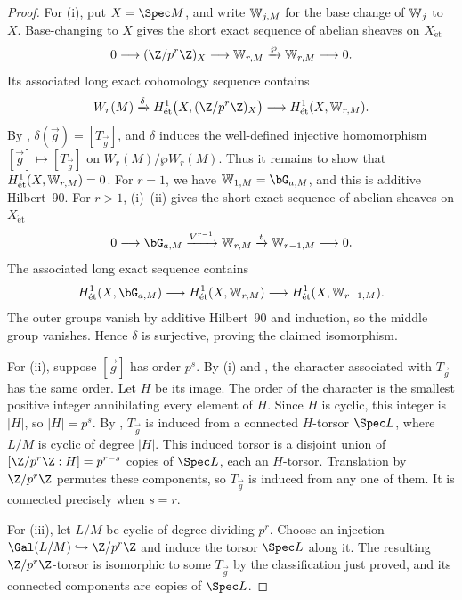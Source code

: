 \begin{proof}
For (i), put $X=\Spec M$, and write $\mathbb{W}_{j,M}$ for the base change of $\mathbb{W}_j$
to $X$. Base-changing  to $X$ gives the
short exact sequence of abelian sheaves on $X_{\mathrm{\acute et}}$
\[
0\longrightarrow(\Z/p^r\Z)_X
\longrightarrow\bW_{r,M}\xrightarrow{\wp}\bW_{r,M}
\longrightarrow0.
\]
Its associated long exact cohomology sequence contains
\[
W_r(M)\xrightarrow{\delta}
H^1_{\mathrm{\acute et}}\bigl(X,(\Z/p^r\Z)_X\bigr)
\longrightarrow H^1_{\mathrm{\acute et}}(X,\bW_{r,M}).
\]
By , $\delta(\vec g)=[T_{\vec g}]$,
and $\delta$ induces the well-defined injective homomorphism
$[\vec g]\mapsto[T_{\vec g}]$ on $W_r(M)/\wp W_r(M)$.
Thus it remains to show that $H^1_{\mathrm{\acute et}}(X,\mathbb{W}_{r,M})=0$.
For $r=1$, we have $\bW_{1,M}=\bG_{a,M}$, and this is additive
Hilbert~90. For $r>1$, (i)--(ii) gives the
short exact sequence of abelian sheaves on $X_{\mathrm{\acute et}}$
\[
0\longrightarrow\bG_{a,M}\xrightarrow{V^{r-1}}\bW_{r,M}
\xrightarrow{t}\bW_{r-1,M}\longrightarrow0.
\]
The associated long exact sequence contains
\[
H^1_{\mathrm{\acute et}}(X,\bG_{a,M})
\longrightarrow
H^1_{\mathrm{\acute et}}(X,\bW_{r,M})
\longrightarrow
H^1_{\mathrm{\acute et}}(X,\bW_{r-1,M}).
\]
The outer groups vanish by additive Hilbert~90 and induction, so the middle
group vanishes. Hence $\delta$ is surjective, proving the claimed
isomorphism.

For (ii), suppose $[\vec g]$ has order $p^s$. By (i) and
, the character associated
with $T_{\vec g}$ has the same order. Let $H$ be its image. The order of
the character is the smallest positive integer annihilating every element
of $H$. Since $H$ is cyclic, this integer is $|H|$, so $|H|=p^s$.
By , $T_{\vec g}$ is induced
from a connected $H$-torsor $\Spec L$, where $L/M$ is cyclic of degree
$|H|$. This induced torsor is a disjoint union of
$[\Z/p^r\Z:H]=p^{r-s}$ copies of $\Spec L$, each an $H$-torsor.
Translation by $\Z/p^r\Z$ permutes these components, so $T_{\vec g}$ is
induced from any one of them. It is connected precisely when $s=r$.

For (iii), let $L/M$ be cyclic of degree dividing $p^r$. Choose an
injection $\Gal(L/M)\hookrightarrow\Z/p^r\Z$ and induce the torsor
$\Spec L$ along it. The resulting $\Z/p^r\Z$-torsor is isomorphic to some
$T_{\vec g}$ by the classification just proved, and its connected
components are copies of $\Spec L$.
\end{proof}


